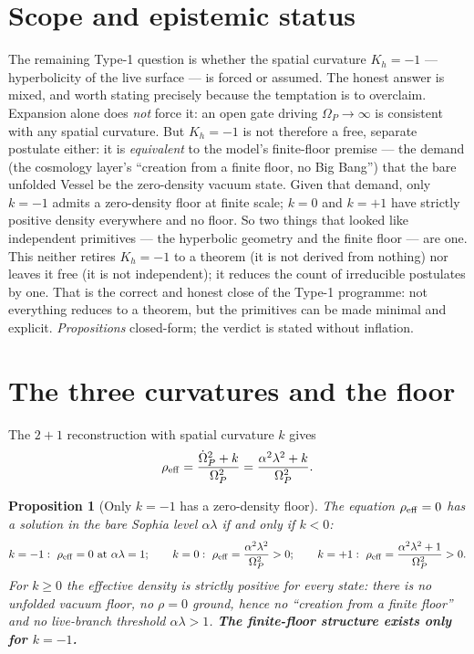 \documentclass[11pt,a4paper,oneside]{book}
\newcommand{\Op}{\Omega_P}
\theoremstyle{plain}
\newtheorem{proposition}{Proposition}[chapter]
\theoremstyle{definition}
\theoremstyle{remark}
\begin{document}
\section*{Scope and epistemic status}
The remaining Type-1 question is whether the spatial curvature $K_h=-1$ --- hyperbolicity of the live
surface --- is forced or assumed. The honest answer is mixed, and worth stating precisely because the
temptation is to overclaim. Expansion alone does \emph{not} force it: an open gate driving
$\Op\to\infty$ is consistent with any spatial curvature. But $K_h=-1$ is not therefore a free, separate
postulate either: it is \emph{equivalent} to the model's finite-floor premise --- the demand
(the cosmology layer's ``creation from a finite floor, no Big Bang'') that the bare unfolded Vessel be
the zero-density vacuum state. Given that demand, only $k=-1$ admits a zero-density floor at finite
scale; $k=0$ and $k=+1$ have strictly positive density everywhere and no floor. So two things that
looked like independent primitives --- the hyperbolic geometry and the finite floor --- are one. This
neither retires $K_h=-1$ to a theorem (it is not derived from nothing) nor leaves it free (it is not
independent); it reduces the count of irreducible postulates by one. That is the correct and honest
close of the Type-1 programme: not everything reduces to a theorem, but the primitives can be made
minimal and explicit. \emph{Propositions} closed-form; the verdict is stated without inflation.

\section{The three curvatures and the floor}

The $2{+}1$ reconstruction with spatial curvature $k$ gives
\begin{equation}
\rho_{\rm eff}=\frac{\dot\Op^2+k}{\Op^2}=\frac{\alpha^2\lambda^2+k}{\Op^2}.
\end{equation}

\begin{proposition}[Only $k=-1$ has a zero-density floor]\label{curvaturefloor:prop:floor}
The equation $\rho_{\rm eff}=0$ has a solution in the bare Sophia level $\alpha\lambda$ if and only if
$k<0$:
\begin{equation}
k=-1:\ \rho_{\rm eff}=0\ \text{at}\ \alpha\lambda=1;\qquad
k=0:\ \rho_{\rm eff}=\frac{\alpha^2\lambda^2}{\Op^2}>0;\qquad
k=+1:\ \rho_{\rm eff}=\frac{\alpha^2\lambda^2+1}{\Op^2}>0.
\end{equation}
For $k\ge0$ the effective density is strictly positive for every state: there is no unfolded vacuum
floor, no $\rho=0$ ground, hence no ``creation from a finite floor'' and no live-branch threshold
$\alpha\lambda>1$. \textbf{The finite-floor structure exists only for $k=-1$.}
\end{proposition}
\end{document}
